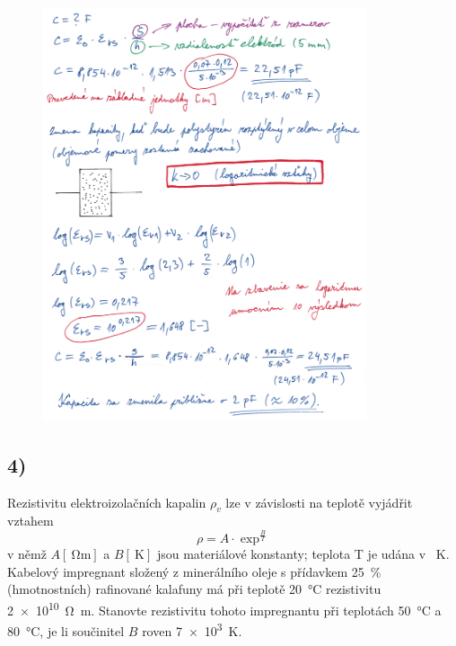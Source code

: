 \begin{figure}[h]
    \centering
    \includegraphics*[width=0.85\textwidth]{images/diel3_1.jpg}
\end{figure}

\newpage


\subsection*{4)}
Rezistivitu elektroizolačních kapalin $\rho_v$ lze v závislosti na teplotě vyjádřit vztahem
\begin{equation}
    \rho=A\cdot\exp^\frac{B}{T}
\end{equation}
v němž $A [\SI{}{\ohm\meter}]$ a $B [\SI{}{\kelvin}]$ jsou materiálové konstanty; teplota T je udána v \SI{}{\kelvin}. Kabelový impregnant složený z minerálního oleje s přídavkem \SI{25}{\percent} (hmotnostních) rafinované kalafuny má při teplotě \SI{20}{\degreeCelsius} rezistivitu \SI{2e10}{\ohm\meter}. Stanovte rezistivitu tohoto impregnantu při teplotách \SI{50}{\degreeCelsius} a \SI{80}{\degreeCelsius}, je li součinitel $B$ roven \SI{7e3}{\kelvin}.

